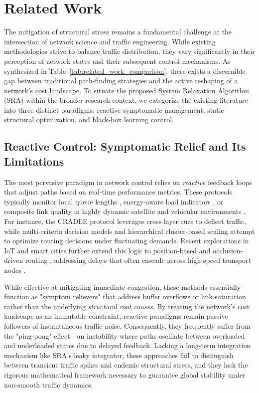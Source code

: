 \documentclass{ccjnl}
\begin{document}
\section{Related Work}
\label{sec:related_work}

The mitigation of structural stress remains a fundamental challenge at the intersection of network science and traffic engineering. While existing methodologies strive to balance traffic distribution, they vary significantly in their perception of network states and their subsequent control mechanisms. As synthesized in Table~\ref{tab:related_work_comparison}, there exists a discernible gap between traditional path-finding strategies and the active reshaping of a network's cost landscape. To situate the proposed System Relaxation Algorithm (SRA) within the broader research context, we categorize the existing literature into three distinct paradigms: reactive symptomatic management, static structural optimization, and black-box learning control.

\subsection{Reactive Control: Symptomatic Relief and Its Limitations}

The most pervasive paradigm in network control relies on \textit{reactive} feedback loops that adjust paths based on real-time performance metrics. These protocols typically monitor local queue lengths \cite{Macabale2020Cradle}, energy-aware load indicators \cite{SM2025Novel}, or composite link quality in highly dynamic satellite and vehicular environments \cite{Wang2025VANET, Fu2024SatelliteBC,wang2022cdmr}. For instance, the CRADLE protocol \cite{Macabale2020Cradle} leverages cross-layer cues to deflect traffic, while multi-criteria decision models \cite{Fouad2014MultiCriteria} and hierarchical cluster-based scaling \cite{Guizani2011Hierarchical} attempt to optimize routing decisions under fluctuating demands. Recent explorations in IoT and smart cities further extend this logic to position-based and occlusion-driven routing \cite{Darabkh2025SmartCity, Aditya2020ClosenessCluster}, addressing delays that often cascade across high-speed transport nodes \cite{Wu2024RailwayNode,ma2022traffic}.

While effective at mitigating immediate congestion, these methods essentially function as "symptom relievers" that address buffer overflows or link saturation rather than the underlying \textit{structural root causes}. By treating the network's cost landscape as an immutable constraint, reactive paradigms remain passive followers of instantaneous traffic noise. Consequently, they frequently suffer from the "ping-pong" effect—an instability where paths oscillate between overloaded and underloaded states due to delayed feedback. Lacking a long-term integration mechanism like SRA's leaky integrator, these approaches fail to distinguish between transient traffic spikes and endemic structural stress, and they lack the rigorous mathematical framework necessary to guarantee global stability under non-smooth traffic dynamics.
\end{document}
